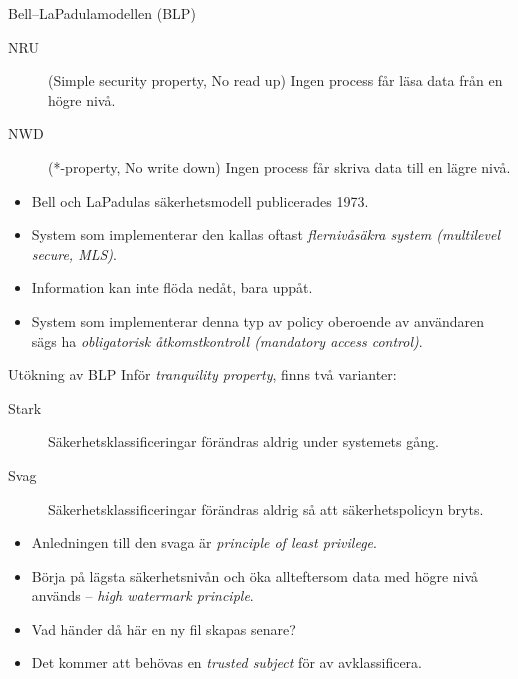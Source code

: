 \begin{frame}{\insertsubsectionhead}
  \begin{block}{Bell--LaPadulamodellen (BLP)}
    \begin{description}
      \item[NRU] (Simple security property, No read up) Ingen process får läsa 
        data från en högre nivå.
      \item[NWD] (*-property, No write down) Ingen process får skriva data till 
        en lägre nivå.
    \end{description}
  \end{block}
  \begin{itemize}
    \item Bell och LaPadulas säkerhetsmodell publicerades 1973.
    \item System som implementerar den kallas oftast \emph{flernivåsäkra system 
      (multilevel secure, MLS)}.
    \item Information kan inte flöda nedåt, bara uppåt.
    \item System som implementerar denna typ av policy oberoende av användaren 
      sägs ha \emph{obligatorisk åtkomstkontroll (mandatory access control)}.
  \end{itemize}
\end{frame}
\begin{frame}{\insertsubsectionhead}
  \begin{block}{Utökning av BLP}
    Inför \emph{tranquility property}, finns två varianter:
    \begin{description}
      \item[Stark] Säkerhetsklassificeringar förändras aldrig under systemets 
        gång.
      \item[Svag] Säkerhetsklassificeringar förändras aldrig så att 
        säkerhetspolicyn bryts.
    \end{description}
  \end{block}
  \begin{itemize}
    \item Anledningen till den svaga är \emph{principle of least privilege}.
    \item Börja på lägsta säkerhetsnivån och öka allteftersom data med högre 
      nivå används -- \emph{high watermark principle}.
    \item Vad händer då här en ny fil skapas senare?
    \item Det kommer att behövas en \emph{trusted subject} för av 
      avklassificera.
  \end{itemize}
\end{frame}


